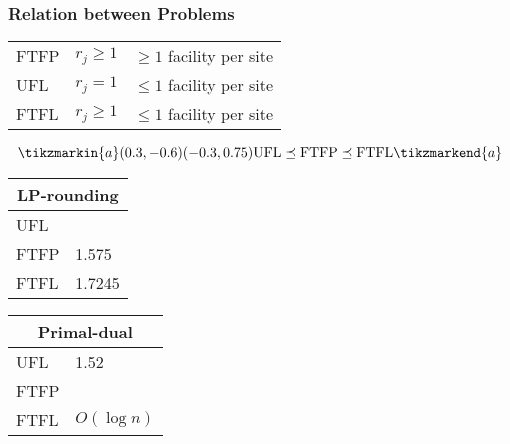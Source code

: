 \documentclass[hyperref,dvipsnames,svgnames,compress]{beamer}
\begin{document}
\begin{frame}
  \frametitle{Relation between Problems}
  \begin{center}
  \begin{tabular}{l  l  l}
    \rowcolor{light-gray}
    FTFP & $r_j \geq 1$ & $\geq 1$ facility per site\\
    \rowcolor{light-gray}
    UFL  & $r_j = 1$ & $\leq 1$ facility per site\\
    \rowcolor{light-gray}
    FTFL & $r_j \geq 1$ & $\leq 1$ facility per site\\
  \end{tabular}
  \end{center}
  
  \vspace{.3in}
  \pause
  \large{
  \begin{equation*}
    \tikzmarkin{a}(0.3,-0.6)(-0.3,0.75)
    \text{UFL} \preceq \text{FTFP} \preceq \text{FTFL}
    \tikzmarkend{a}
  \end{equation*}
  }

  \pause
  \begin{minipage}{.45\linewidth}
  \vspace{.3in}
  \begin{center}
    \begin{tabular}{l l}
      \multicolumn{2}{c}{LP-rounding}\\
      \hline
      \rowcolor{GreenYellow}
      UFL & \\
      \rowcolor{GreenYellow}
      FTFP & \multirow{-2}{*}{1.575}\\
      \rowcolor{Cyan}
      FTFL & 1.7245\\
    \end{tabular}
    \end{center}
  \end{minipage}
  \pause
  \begin{minipage}{.45\linewidth}
  \vspace{.3in}
  \begin{center}
    \begin{tabular}{l l}
      \multicolumn{2}{c}{Primal-dual}\\
      \hline
      \rowcolor{GreenYellow}
      UFL & 1.52\\
      \rowcolor{Cyan}
      FTFP & \\
      \rowcolor{Cyan}
      FTFL & \multirow{-2}{*}{$O(\log n)$}\\
    \end{tabular}
    \end{center}
  \end{minipage}
\end{frame}
\end{document}
